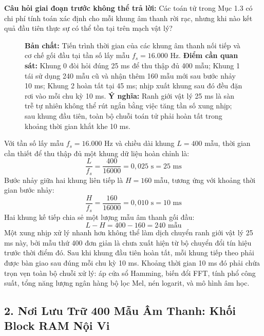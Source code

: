 \documentclass[11pt,a4paper]{article}
\begin{document}
\textbf{Câu hỏi giai đoạn trước không thể trả lời:} Các toán tử trong Mục 1.3 có chi phí tính toán xác định cho mỗi khung âm thanh rời rạc, nhưng khi nào kết quả đầu tiên thực sự có thể tồn tại trên mạch vật lý?

\begin{figure}[h]
\centering

\caption{\textbf{Bản chất:} Tiến trình thời gian của các khung âm thanh nối tiếp và cơ chế gối đầu tại tần số lấy mẫu $f_s = 16.000\text{ Hz}$. \textbf{Điểm cần quan sát:} Khung 0 đòi hỏi đúng 25 ms để thu thập đủ 400 mẫu; Khung 1 tái sử dụng 240 mẫu cũ và nhận thêm 160 mẫu mới sau bước nhảy 10 ms; Khung 2 hoàn tất tại 45 ms; nhịp xuất khung sau đó đều đặn rơi vào mỗi chu kỳ 10 ms. \textbf{Ý nghĩa:} Ranh giới vật lý 25 ms là sàn trễ tự nhiên không thể rút ngắn bằng việc tăng tần số xung nhịp; sau khung đầu tiên, toàn bộ chuỗi toán tử phải hoàn tất trong khoảng thời gian khắt khe 10 ms.}
\label{fig:1_4a_timeline}
\end{figure}

Với tần số lấy mẫu $f_s = 16.000\text{ Hz}$ và chiều dài khung $L = 400$ mẫu, thời gian cần thiết để thu thập đủ một khung dữ liệu hoàn chỉnh là:
\[
\frac{L}{f_s} = \frac{400}{16000} = 0{,}025\text{ s} = 25\text{ ms}
\]
Bước nhảy giữa hai khung liên tiếp là $H = 160$ mẫu, tương ứng với khoảng thời gian bước nhảy:
\[
\frac{H}{f_s} = \frac{160}{16000} = 0{,}010\text{ s} = 10\text{ ms}
\]
Hai khung kế tiếp chia sẻ một lượng mẫu âm thanh gối đầu:
\[
L - H = 400 - 160 = 240\text{ mẫu}
\]
Một xung nhịp xử lý nhanh hơn không thể làm dịch chuyển ranh giới vật lý 25 ms này, bởi mẫu thứ 400 đơn giản là chưa xuất hiện từ bộ chuyển đổi tín hiệu trước thời điểm đó. Sau khi khung đầu tiên hoàn tất, mỗi khung tiếp theo phải được bàn giao sau đúng mỗi chu kỳ 10 ms. Khoảng thời gian 10 ms đó phải chứa trọn vẹn toàn bộ chuỗi xử lý: áp cửa sổ Hamming, biến đổi FFT, tính phổ công suất, tổng năng lượng ngân hàng bộ lọc Mel, nén logarit, và mô hình âm học.

\clearpage


\subsection*{2. Nơi Lưu Trữ 400 Mẫu Âm Thanh: Khối Block RAM Nội Vi}
\end{document}
